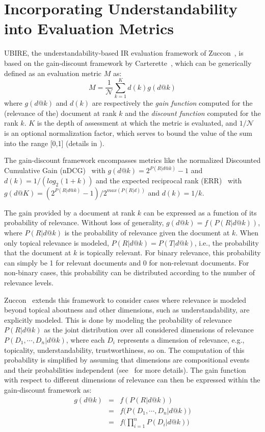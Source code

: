 \section{Incorporating Understandability into Evaluation Metrics}
\label{sec:understandability_metrics}

UBIRE, the understandability-based IR evaluation framework of Zuccon~\cite{zuccon14,zuccon16}, is based on the gain-discount framework by Carterette~\cite{carterette11}, which can be generically defined as an evaluation metric $M$ as:
%
\begin{equation}
M=\frac{1}{\mathcal{N}} \sum_{k=1}^{K} d(k) g(d@k)
\end{equation}
%
where $g(d@k)$ and $d(k)$ are respectively the \textit{gain function} computed for the (relevance of the) document at rank $k$ and the \textit{discount function} computed for the rank $k$.
$K$ is the depth of assessment at which the metric is evaluated, and $1/\mathcal{N}$ is an optional normalization factor, which serves to bound the value of the sum into the range [0,1] (details in \cite{smucker12}).

The gain-discount framework encompasses metrics like the normalized Discounted Cumulative Gain (nDCG)~\cite{jarvelin02} with $g(d@k) = 2^{P(R|d@k)} - 1$ and $d(k) = 1/(log_2(1 + k))$ 
and the expected reciprocal rank (ERR)~\cite{chapelle09} with $g(d@K) =  (2^{P (R|d@k)} - 1)/2^{max(P (R|d))}$ and $d(k) = 1/k$.

The gain provided by a document at rank $k$ can be expressed as a function of its probability of relevance. Without loss of generality, $g(d@k) = f(P(R|d@k))$, where $P(R|d@k)$ is the probability of relevance given the document at $k$. 
When only topical relevance is modeled, $P(R|d@k) = P(T|d@k)$, i.e., the probability that the document at $k$ is topically relevant. 
For binary relevance, this probability can simply be 1 for relevant documents and 0 for non-relevant documents. For non-binary cases, this probability can be distributed according to the number of relevance levels.

Zuccon~\cite{zuccon16} extends this framework to consider cases where relevance is modeled beyond topical aboutness and other dimensions, such as understandability, are explicitly modeled.
This is done by modeling the probability of relevance $P(R|d@k)$ as the joint distribution over all considered dimensions of relevance $P(D_1, \cdots, D_n|d@k)$, where  each $D_i$ represents a dimension of relevance, e.g., topicality, understandability, trustworthiness, so on. The computation of this probability is simplified by assuming  that dimensions are compositional events and their probabilities independent (see~\cite{zuccon16} for more details). The gain function with respect to different dimensions of relevance can then be expressed within the gain-discount framework as:
%
\begin{eqnarray}
    g(d@k) &=& f(P(R|d@k)) \\
    &=& f\big(P(D_1, \cdots, D_n|d@k)\big) \\
    &=& f\Big(\prod_{i=1}^n P(D_i|d@k)\Big) 
\end{eqnarray}
%

